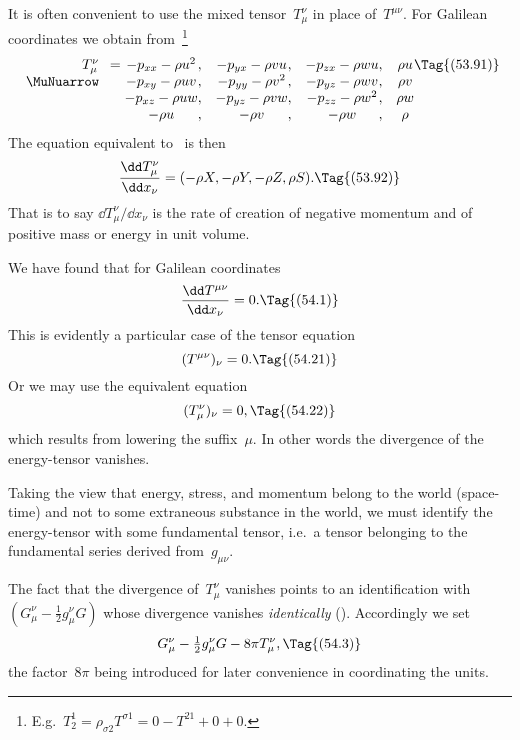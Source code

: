 \documentclass[12pt]{book}
\begin{document}
It is often convenient to use the mixed tensor~$T_{\mu}^{\nu}$ in place of~$T^{\mu\nu}$. For
Galilean coordinates we obtain from~\footnote
  {E.g.\ $T_{2}^{1} = \rho_{\sigma 2} T^{\sigma 1} = 0 - T^{21} + 0 + 0$.}
\[
\begin{array}[t]{r}
  T_{\mu}^{\nu} \\
  \MuNuarrow
\end{array}
=
\begin{array}[t]{@{}c@{,\quad}c@{,\quad}c@{,\quad}c@{}}
  -p_{xx} - \rho u^{2} & -p_{yx} - \rho v u & -p_{zx} - \rho w u & \rho u\\
  -p_{xy} - \rho u v & -p_{yy} - \rho v^{2} & -p_{yz} - \rho w v & \rho v\\
  -p_{xz} - \rho u w & -p_{yz} - \rho v w & -p_{zz} - \rho w^{2} & \rho w\\
  -\rho u & -\rho v & -\rho w & \rho\\
\end{array}
\Tag{(53.91)}
\]
The equation equivalent to~ is then
\[
\frac{\dd T_{\mu}^{\nu}}{\dd x_{\nu}} = (-\rho X,-\rho Y,-\rho Z, \rho S).
\Tag{(53.92)}
\]
That is to say $\dd T_{\mu}^{\nu}/\dd x_{\nu}$ is the rate of creation of negative momentum and of
positive mass or energy in unit volume.

%
%

We have found that for Galilean coordinates
\[
\frac{\dd T^{\mu\nu}}{\dd x_{\nu}} = 0.
\Tag{(54.1)}
\]
This is evidently a particular case of the tensor equation
\[
(T^{\mu\nu})_{\nu} = 0.
\Tag{(54.21)}
\]
Or we may use the equivalent equation
\[
(T_{\mu}^{\nu})_{\nu} = 0,
\Tag{(54.22)}
\]
which results from lowering the suffix~$\mu$. In other words the divergence of
%
the energy-tensor vanishes.

Taking the view that energy, stress, and momentum belong to the world
(space-time) and not to some extraneous substance in the world, we must
identify the energy-tensor with some fundamental tensor, i.e.\ a tensor belonging
to the fundamental series derived from~$g_{\mu\nu}$.

The fact that the divergence of~$T_{\mu}^{\nu}$ vanishes points to an identification
with $(G_{\mu}^{\nu} - \frac{1}{2}g_{\mu}^{\nu} G)$ whose divergence vanishes \emph{identically} (). Accordingly
we set
\[
G_{\mu}^{\nu} - \tfrac{1}{2}g_{\mu}^{\nu} G - 8\pi T_{\mu}^{\nu},
\Tag{(54.3)}
\]
the factor~$8\pi$ being introduced for later convenience in coordinating the units.
\end{document}
